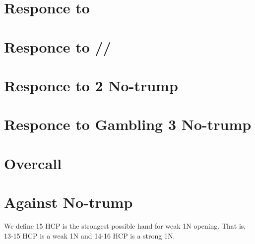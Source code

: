 \documentclass[12pt,twoside,a5paper]{report}%
\begin{document}
\chapter*{Responce to }
\chapter*{Responce to /\he{}/\sp{}}
\chapter*{Responce to 2 No-trump}
\chapter*{Responce to Gambling 3 No-trump}
\chapter*{Overcall}
\chapter*{Against No-trump}
	We define 15 HCP is the strongest possible hand for weak 1N opening. That is, 13-15 HCP is a weak 1N and 14-16 HCP is a strong 1N. 
\end{document}

